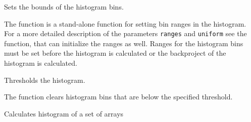 Sets the bounds of the histogram bins.


\begin{description}
\end{description}

The function is a stand-alone function for setting bin ranges in the histogram. For a more detailed description of the parameters \texttt{ranges} and \texttt{uniform} see the  function, that can initialize the ranges as well. Ranges for the histogram bins must be set before the histogram is calculated or the backproject of the histogram is calculated.

\fi

Thresholds the histogram.


\begin{description}
\end{description}

The function clears histogram bins that are below the specified threshold.

\fi

\ifCpp

Calculates histogram of a set of arrays

